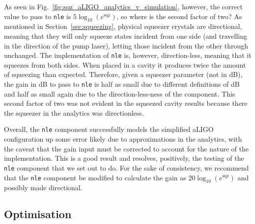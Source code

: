 \documentclass[aps,pra,superscriptaddress,reprint,nofootinbib]{revtex4-1}
\newcommand{\code}[1]{\texttt{#1}}
\begin{document}
As seen in Fig.~\ref{fig:sqz_aLIGO_analytics_v_simulation}, however, the correct value to pass to \code{nle} is $5 \log_{10}(e^\mathrm{sqz})$, so where is the second factor of two? As mentioned in Section~\ref{sec:squeezing}, physical squeezer crystals are directional, meaning that they will only squeeze states incident from one side (and travelling in the direction of the pump laser), letting those incident from the other through unchanged. The implementation of \code{nle} is, however, direction-less, meaning that it squeezes from both sides. When placed in a cavity it produces twice the amount of squeezing than expected. Therefore, given a squeezer parameter (not in dB), the gain in dB to pass to \code{nle} is half as small due to different definitions of dB and half as small again due to the direction-less-ness of the component. This second factor of two was not evident in the squeezed cavity results because there the squeezer in the analytics was directionless.


Overall, the \code{nle} component successfully models the simplified aLIGO configuration up some error likely due to approximations in the analytics, with the caveat that the gain input must be corrected to account for the nature of the implementation. This is a good result and resolves, positively, the testing of the \code{nle} component that we set out to do. For the sake of consistency, we recommend that the \code{nle} component be modified to calculate the gain as $20 \log_{10}(e^\mathrm{sqz})$ and possibly made directional.


\subsection{Optimisation}
\end{document}
